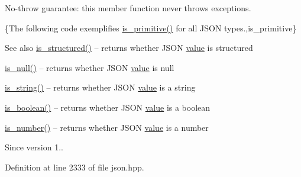 No-\/throw guarantee\+: this member function never throws exceptions.

\{The following code exemplifies {\ttfamily \hyperlink{classnlohmann_1_1basic__json_a7c774ef0eceff6d06095f617e2dbd488}{is\+\_\+primitive()}} for all J\+S\+O\+N types.,is\+\_\+primitive\}

\begin{DoxySeeAlso}{See also}
\hyperlink{classnlohmann_1_1basic__json_a558b345044c38a9f6ad522592cc700c8}{is\+\_\+structured()} -- returns whether J\+S\+O\+N \hyperlink{classnlohmann_1_1basic__json_a0a2cbbd95862a623e7dc5c37e67dead0}{value} is structured 

\hyperlink{classnlohmann_1_1basic__json_a685d9d6a8a45bfcb8455b147257cdffb}{is\+\_\+null()} -- returns whether J\+S\+O\+N \hyperlink{classnlohmann_1_1basic__json_a0a2cbbd95862a623e7dc5c37e67dead0}{value} is {\ttfamily null} 

\hyperlink{classnlohmann_1_1basic__json_ab22c8d61eca51f0308c263487bd35f03}{is\+\_\+string()} -- returns whether J\+S\+O\+N \hyperlink{classnlohmann_1_1basic__json_a0a2cbbd95862a623e7dc5c37e67dead0}{value} is a string 

\hyperlink{classnlohmann_1_1basic__json_a8f7e67d903f918cd08261219fb47a9f0}{is\+\_\+boolean()} -- returns whether J\+S\+O\+N \hyperlink{classnlohmann_1_1basic__json_a0a2cbbd95862a623e7dc5c37e67dead0}{value} is a boolean 

\hyperlink{classnlohmann_1_1basic__json_a1407f91b4689bbc56d1a3c401a5bb649}{is\+\_\+number()} -- returns whether J\+S\+O\+N \hyperlink{classnlohmann_1_1basic__json_a0a2cbbd95862a623e7dc5c37e67dead0}{value} is a number
\end{DoxySeeAlso}
\begin{DoxySince}{Since}
version 1.. 
\end{DoxySince}


Definition at line 2333 of file json.\+hpp.

\hypertarget{classnlohmann_1_1basic__json_a558b345044c38a9f6ad522592cc700c8}{}
